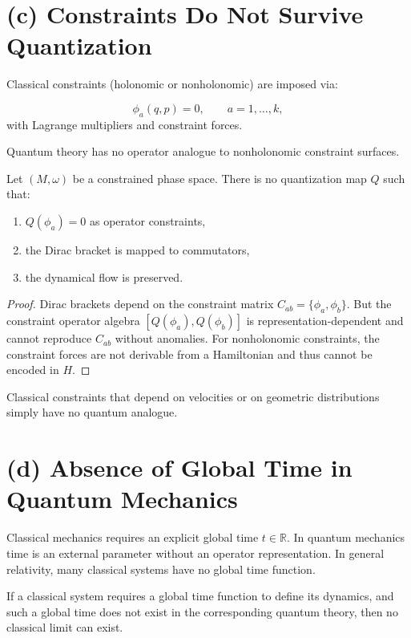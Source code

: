\documentclass[12pt]{article}
\begin{document}
\section{(c) Constraints Do Not Survive Quantization}

Classical constraints (holonomic or nonholonomic) are imposed via:

\[
\phi_a(q,p)=0,\qquad a=1,\dots,k,
\]
with Lagrange multipliers and constraint forces.

Quantum theory has no operator analogue to nonholonomic constraint surfaces.

\begin{theorem}
Let $(M,\omega)$ be a constrained phase space.  
There is no quantization map $Q$ such that:
\begin{enumerate}
\item $Q(\phi_a)=0$ as operator constraints,
\item the Dirac bracket is mapped to commutators,
\item the dynamical flow is preserved.
\end{enumerate}
\end{theorem}

\begin{proof}
Dirac brackets depend on the constraint matrix $C_{ab}=\{\phi_a,\phi_b\}$.  
But the constraint operator algebra $[Q(\phi_a),Q(\phi_b)]$ is representation-dependent and cannot reproduce $C_{ab}$ without anomalies.  
For nonholonomic constraints, the constraint forces are not derivable from a Hamiltonian and thus cannot be encoded in $H$.
\end{proof}

Classical constraints that depend on velocities or on geometric distributions simply have no quantum analogue.


\section{(d) Absence of Global Time in Quantum Mechanics}

Classical mechanics requires an explicit global time $t\in\mathbb{R}$.  
In quantum mechanics time is an external parameter without an operator representation.  
In general relativity, many classical systems have no global time function.

\begin{theorem}
If a classical system requires a global time function to define its dynamics, and such a global time does not exist in the corresponding quantum theory, then no classical limit can exist.
\end{theorem}
\end{document}
